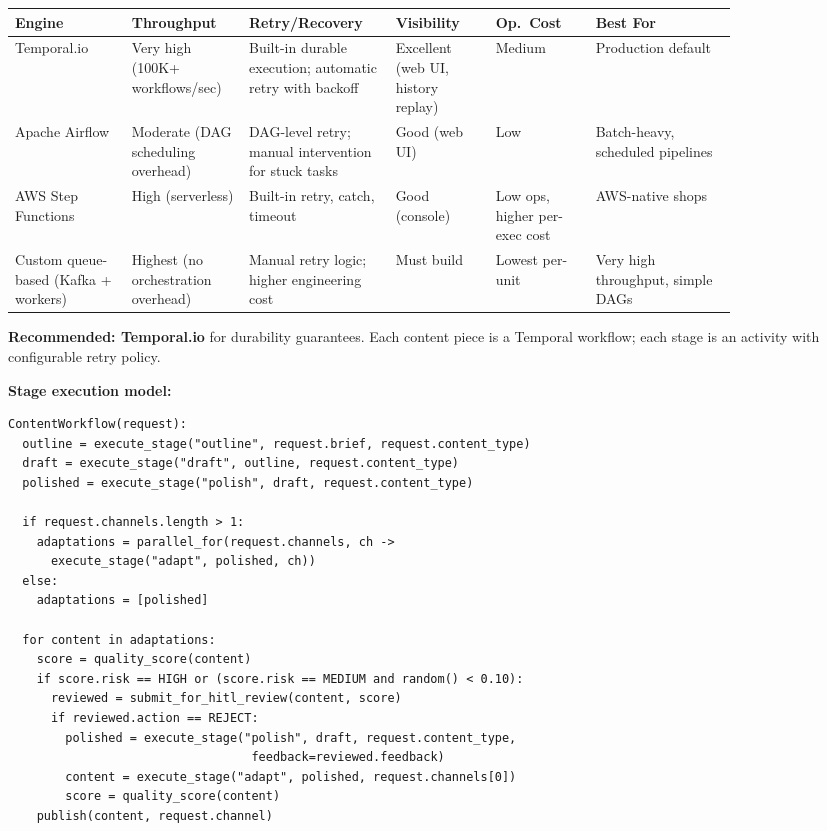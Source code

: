 \begin{tabular}{|p{0.14\linewidth}|p{0.12\linewidth}|p{0.17\linewidth}|p{0.12\linewidth}|p{0.12\linewidth}|p{0.17\linewidth}|}
\hline
\textbf{Engine} & \textbf{Throughput} & \textbf{Retry/Recovery} & \textbf{Visibility} & \textbf{Op.\ Cost} & \textbf{Best For} \\
\hline
Temporal.io & Very high (100K+ workflows/sec) & Built-in durable execution; automatic retry with backoff & Excellent (web UI, history replay) & Medium & Production default \\
\hline
Apache Airflow & Moderate (DAG scheduling overhead) & DAG-level retry; manual intervention for stuck tasks & Good (web UI) & Low & Batch-heavy, scheduled pipelines \\
\hline
AWS Step Functions & High (serverless) & Built-in retry, catch, timeout & Good (console) & Low ops, higher per-exec cost & AWS-native shops \\
\hline
Custom queue-based (Kafka + workers) & Highest (no orchestration overhead) & Manual retry logic; higher engineering cost & Must build & Lowest per-unit & Very high throughput, simple DAGs \\
\hline
\end{tabular}

\textbf{Recommended: Temporal.io} for durability guarantees. Each content piece is a Temporal workflow; each stage is an activity with configurable retry policy.

\textbf{Stage execution model:}

\begin{verbatim}
ContentWorkflow(request):
  outline = execute_stage("outline", request.brief, request.content_type)
  draft = execute_stage("draft", outline, request.content_type)
  polished = execute_stage("polish", draft, request.content_type)

  if request.channels.length > 1:
    adaptations = parallel_for(request.channels, ch ->
      execute_stage("adapt", polished, ch))
  else:
    adaptations = [polished]

  for content in adaptations:
    score = quality_score(content)
    if score.risk == HIGH or (score.risk == MEDIUM and random() < 0.10):
      reviewed = submit_for_hitl_review(content, score)
      if reviewed.action == REJECT:
        polished = execute_stage("polish", draft, request.content_type,
                                  feedback=reviewed.feedback)
        content = execute_stage("adapt", polished, request.channels[0])
        score = quality_score(content)
    publish(content, request.channel)
\end{verbatim}

